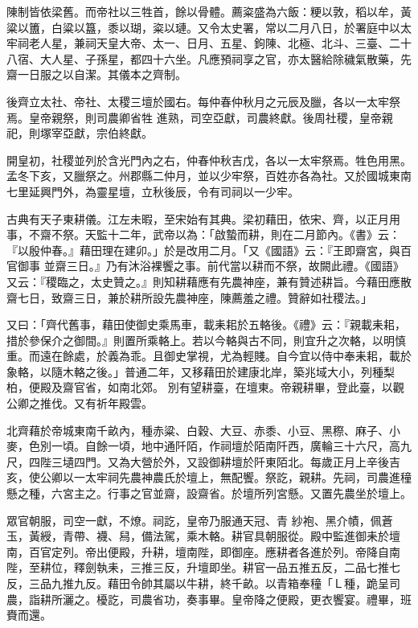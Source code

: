 \begin{pinyinscope}
 陳制皆依梁舊。而帝社以三牲首，餘以骨體。薦粢盛為六飯：粳以敦，稻以牟，黃粱以簠，白粱以簋，黍以瑚，粢以璉。又令太史署，常以二月八日，於署庭中以太牢祠老人星，兼祠天皇大帝、太一、日月、五星、鉤陳、北極、北斗、三臺、二十八宿、大人星、子孫星，都四十六坐。凡應預祠享之官，亦太醫給除穢氣散藥，先齋一日服之以自潔。其儀本之齊制。



 後齊立太社、帝社、太稷三壇於國右。每仲春仲秋月之元辰及臘，各以一太牢祭焉。皇帝親祭，則司農卿省牲
 進熟，司空亞獻，司農終獻。後周社稷，皇帝親祀，則塚宰亞獻，宗伯終獻。



 開皇初，社稷並列於含光門內之右，仲春仲秋吉戊，各以一太牢祭焉。牲色用黑。孟冬下亥，又臘祭之。州郡縣二仲月，並以少牢祭，百姓亦各為社。又於國城東南七里延興門外，為靈星壇，立秋後辰，令有司祠以一少牢。



 古典有天子東耕儀。江左未暇，至宋始有其典。梁初藉田，依宋、齊，以正月用事，不齋不祭。天監十二年，武帝以為：「啟蟄而耕，則在二月節內。《書》云：『以殷仲春。』藉田理在建卯。」於是改用二月。「又《國語》云：『王即齋宮，與百官御事
 並齋三日。』乃有沐浴裸饗之事。前代當以耕而不祭，故闕此禮。《國語》又云：『稷臨之，太史贊之。』則知耕藉應有先農神座，兼有贊述耕旨。今藉田應散齋七日，致齋三日，兼於耕所設先農神座，陳薦羞之禮。贊辭如社稷法。」



 又曰：「齊代舊事，藉田使御史乘馬車，載耒耜於五輅後。《禮》云：『親載耒耜，措於參保介之御間。』則置所乘輅上。若以今輅與古不同，則宜升之次輅，以明慎重。而遠在餘處，於義為乖。且御史掌視，尤為輕賤。自今宜以侍中奉耒耜，載於象輅，以隨木輅之後。」普通二年，又移藉田於建康北岸，築兆域大小，列種梨柏，便殿及齋官省，如南北郊。
 別有望耕臺，在壇東。帝親耕畢，登此臺，以觀公卿之推伐。又有祈年殿雲。



 北齊藉於帝城東南千畝內，種赤粱、白穀、大豆、赤黍、小豆、黑穄、麻子、小麥，色別一頃。自餘一頃，地中通阡陌，作祠壇於陌南阡西，廣輪三十六尺，高九尺，四陛三壝四門。又為大營於外，又設御耕壇於阡東陌北。每歲正月上辛後吉亥，使公卿以一太牢祠先農神農氏於壇上，無配饗。祭訖，親耕。先祠，司農進穜懸之種，六宮主之。行事之官並齋，設齋省。於壇所列宮懸。又置先農坐於壇上。



 眾官朝服，司空一獻，不燎。祠訖，皇帝乃服通天冠、青
 紗袍、黑介幘，佩蒼玉，黃綬，青帶、襪、舄，備法駕，乘木輅。耕官具朝服從。殿中監進御耒於壇南，百官定列。帝出便殿，升耕，壇南陛，即御座。應耕者各進於列。帝降自南陛，至耕位，釋劍執耒，三推三反，升壇即坐。耕官一品五推五反，二品七推七反，三品九推九反。藉田令帥其屬以牛耕，終千畝。以青箱奉穜「Ｌ種，跪呈司農，詣耕所灑之。櫌訖，司農省功，奏事畢。皇帝降之便殿，更衣饗宴。禮畢，班賚而還。




\end{pinyinscope}
